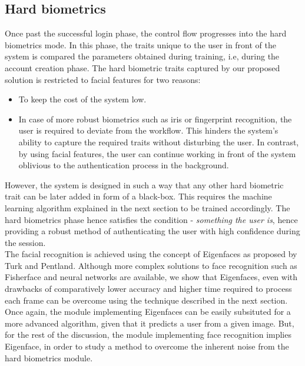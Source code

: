 \documentclass[%
        final,
        notitlepage,
        narroweqnarray,
        inline,
        ]{ieee}
\begin{document}
\subsection{Hard biometrics}
Once past the successful login phase, the control flow progresses into the hard biometrics mode.
In this phase, the traits unique to the user in front of the system is compared the parameters obtained during training, i.e, during the account creation phase.
The hard biometric traits captured by our proposed solution is restricted to facial features for two reasons:
\begin{itemize}
	\item To keep the cost of the system low.
	\item In case of more robust biometrics such as iris or fingerprint recognition, the user is required to deviate from the workflow. This hinders the system's ability to capture the required traits without disturbing the user. In contrast, by using facial features, the user can continue working in front of the system oblivious to the authentication process in the background.
\end{itemize}
However, the system is designed in such a way that any other hard biometric trait can be later added in form of a black-box. This requires the machine learning algorithm explained in the next section to be trained accordingly.
The hard biometrics phase hence satisfies the condition - \emph{something the user is}, hence providing a robust method of authenticating the user with high confidence during the session.\\
The facial recognition is achieved using the concept of Eigenfaces\cite{Turk91} as proposed by Turk and Pentland.
Although more complex solutions to face recognition such as Fisherface and neural networks are available, we show that Eigenfaces, even with drawbacks of comparatively lower accuracy and higher time required to process each frame can be overcome using the technique described in the next section.
Once again, the module implementing Eigenfaces can be easily subsituted for a more advanced algorithm, given that it predicts a user from a given image.
But, for the rest of the discussion, the module implementing face recognition implies Eigenface, in order to study a method to overcome the inherent noise from the hard biometrics module.
\end{document}
